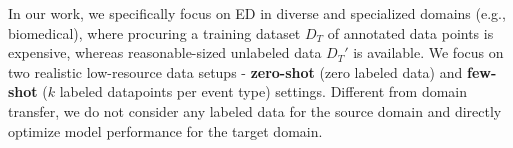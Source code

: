 In our work, we specifically focus on ED in diverse and specialized domains (e.g., biomedical), where procuring a training dataset $D_T$ of annotated data points is expensive, whereas reasonable-sized unlabeled data $D_T'$ is available.
We focus on two realistic low-resource data setups - \textbf{zero-shot} (zero labeled data) and \textbf{few-shot} ($k$ labeled datapoints per event type) settings.
Different from domain transfer, we do not consider any labeled data for the source domain and directly optimize model performance for the target domain.

